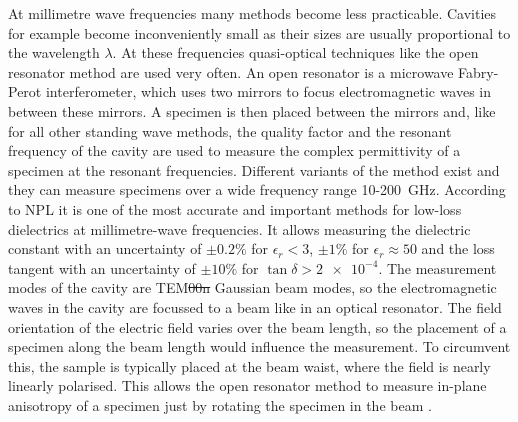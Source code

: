 At millimetre wave frequencies many methods become less practicable. Cavities for example become inconveniently small as their sizes are usually proportional to the wavelength $\lambda$. At these frequencies quasi-optical techniques like the open resonator method are used very often. An open resonator is a microwave Fabry-Perot interferometer, which uses two mirrors to focus electromagnetic waves in between these mirrors. A specimen is then placed between the  mirrors and, like for all other standing wave methods, the quality factor and the resonant frequency of the cavity are used to measure the complex permittivity of a specimen at the resonant frequencies. Different variants of the method exist and they can measure specimens over a wide frequency range 10-\SI{200}{\giga\hertz}. According to NPL \cite{NPL} it is one of the most accurate and important methods for low-loss dielectrics at millimetre-wave frequencies. It allows measuring the dielectric constant with an uncertainty of $\pm 0.2\% $ for $\epsilon_r < 3$, $\pm 1\% $ for $\epsilon_r\approx 50$ and the loss tangent with an uncertainty of $\pm 10\%$ for $\tan\delta >\num{2e-4}$. The measurement modes of the cavity are TEM\st{00n} Gaussian beam modes, so the electromagnetic waves in the cavity are focussed to a beam like in an optical resonator. The field orientation of the electric field varies over the beam length, so the placement of a specimen along the beam length would influence the measurement. To circumvent this, the sample is typically placed at the beam waist, where the field is nearly linearly polarised. This allows the open resonator method to measure in-plane anisotropy of a specimen just by rotating the specimen in the beam \cite{NPL,chen}.

